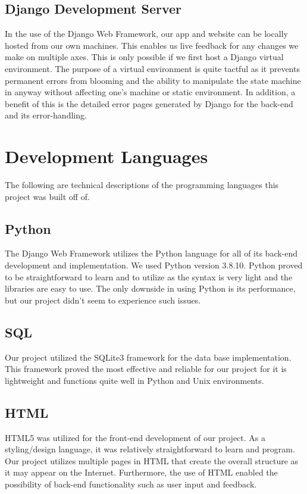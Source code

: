 \documentclass[sigconf]{acmart}
\begin{document}
\subsection{Django Development Server}
In the use of the Django Web Framework, our app and website can be locally hosted from our own machines. This enables us live feedback for any changes we make on multiple axes. This is only possible if we first host a Django virtual environment. The purpose of a virtual environment is quite tactful as it prevents permanent errors from blooming and the ability to manipulate the state machine in anyway without affecting one's machine or static environment. In addition, a benefit of this is the detailed error pages generated by Django for the back-end and its error-handling.

\section{Development Languages}
The following are technical descriptions of the programming languages this project was built off of.

\subsection{Python}
The Django Web Framework utilizes the Python language for all of its back-end development and implementation. We used Python version 3.8.10. Python proved to be straightforward to learn and to utilize as the syntax is very light and the libraries are easy to use. The only downside in using Python is its performance, but our project didn't seem to experience such issues.

\pagebreak
\subsection{SQL}
Our project utilized the SQLite3 framework for the data base implementation. This framework proved the most effective and reliable for our project for it is lightweight and functions quite well in Python and Unix environments.

\subsection{HTML}
HTML5 was utilized for the front-end development of our project. As a styling/design language, it was relatively straightforward to learn and program. Our project utilizes multiple pages in HTML that create the overall structure as it may appear on the Internet. Furthermore, the use of HTML enabled the possibility of back-end functionality such as user input and feedback.
\end{document}
